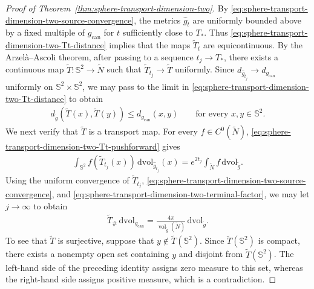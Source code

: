 \documentclass[11pt,reqno]{amsart}
\numberwithin{equation}{section}
\theoremstyle{definition}
\theoremstyle{remark}
\def\bS {\mathbb{S}}
\newcommand{\0}{\emptyset}
\newcommand{\can}{\mathrm{can}}
\newcommand{\vol}{\operatorname{vol}}
\newcommand{\dvol}{\,\mathrm{dvol}}
\begin{document}
\begin{proof}[Proof of Theorem~\ref{thm:sphere-transport-dimension-two}]
By \eqref{eq:sphere-transport-dimension-two-source-convergence}, the metrics
$\widehat g_t$ are uniformly bounded above by a fixed multiple of $g_{\can}$
for $t$ sufficiently close to $T_*$. Thus
\eqref{eq:sphere-transport-dimension-two-Tt-distance} implies that the maps
$\widetilde T_t$ are equicontinuous. By the Arzel\`a--Ascoli theorem, after
passing to a sequence $t_j\to T_*$, there exists a continuous map
$\widetilde T:\bS^2\to\widetilde N$ such that
$\widetilde T_{t_j}\to\widetilde T$ uniformly. Since
$d_{\widehat g_{t_j}}\to d_{g_{\can}}$ uniformly on
$\bS^2\times\bS^2$, we may pass to the limit in
\eqref{eq:sphere-transport-dimension-two-Tt-distance} to obtain
\begin{align}\label{eq:sphere-transport-dimension-two-cover-limit-contraction}
        d_{\widetilde g}(\widetilde T(x),\widetilde T(y))
        \leq
        d_{g_{\can}}(x,y)
        \qquad
        \text{for every }x,y\in\bS^2.
\end{align}
We next verify that $\widetilde T$ is a transport map. For every
$f\in C^0(\widetilde N)$,
\eqref{eq:sphere-transport-dimension-two-Tt-pushforward} gives
\begin{align}
        \int_{\bS^2}f(\widetilde T_{t_j}(x))
        \dvol_{\widehat g_{t_j}}(x)
        =
        e^{2t_j}\int_{\widetilde N}f\dvol_{\widetilde g}.
\end{align}
Using the uniform convergence of $\widetilde T_{t_j}$,
\eqref{eq:sphere-transport-dimension-two-source-convergence}, and
\eqref{eq:sphere-transport-dimension-two-terminal-factor}, we may let
$j\to\infty$ to obtain
\begin{align}\label{eq:sphere-transport-dimension-two-cover-pushforward}
        \widetilde T_\#\dvol_{g_{\can}}
        =
        \frac{4\pi}{\vol_{\widetilde g}(\widetilde N)}
        \dvol_{\widetilde g}.
\end{align}
To see that $\widetilde T$ is surjective, suppose that
$y\notin\widetilde T(\bS^2)$. Since $\widetilde T(\bS^2)$ is compact, there
exists a nonempty open set containing $y$ and disjoint from
$\widetilde T(\bS^2)$. The left-hand side of the preceding identity assigns
zero measure to this set, whereas the right-hand side assigns positive measure,
which is a contradiction.


\end{proof}
\end{document}
